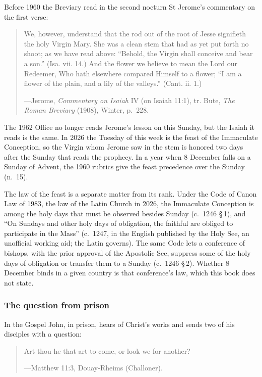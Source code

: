 \noindent Before 1960 the Breviary read in the second nocturn St Jerome's commentary on the first
verse:

\begin{quote}
We, however, understand that the rod out of the root of Jesse signifieth the holy Virgin Mary.
She was a clean stem that had as yet put forth no shoot; as we have read above: ``Behold, the
Virgin shall conceive and bear a son.'' (Isa. vii. 14.) And the flower we believe to mean the
Lord our Redeemer, Who hath elsewhere compared Himself to a flower; ``I am a flower of the plain,
and a lily of the valleys.'' (Cant. ii. 1.)\par
{\smallskip\noindent\small ---Jerome, \textit{Commentary on Isaiah} IV (on Isaiah 11:1), tr.
Bute, \textit{The Roman Breviary} (1908), Winter, p.~228.\par}
\end{quote}

The 1962 Office no longer reads Jerome's lesson on this Sunday, but the Isaiah it reads is the
same. In 2026 the Tuesday of this week is the feast of the Immaculate Conception, so the Virgin
whom Jerome saw in the stem is honored two days after the Sunday that reads the prophecy. In a
year when 8 December falls on a Sunday of Advent, the 1960 rubrics give the feast precedence over
the Sunday (n.~15).

The law of the feast is a separate matter from its rank. Under the Code of Canon Law of 1983, the
law of the Latin Church in 2026, the Immaculate Conception is among the holy days that must be
observed besides Sunday (c.~1246 \S\,1), and ``On Sundays and other holy days of obligation, the
faithful are obliged to participate in the Mass'' (c.~1247, in the English published by
the Holy See, an unofficial working aid; the Latin governs). The same Code lets a conference of bishops, with the
prior approval of the Apostolic See, suppress some of the holy days of obligation or transfer them
to a Sunday (c.~1246 \S\,2). Whether 8 December binds in a given country is that conference's
law, which this book does not state.

\subsubsection{The question from prison}

In the Gospel John, in prison, hears of Christ's works and sends two of his disciples with a
question:

\begin{quote}
Art thou he that art to come, or look we for another?\par
{\smallskip\noindent\small ---Matthew 11:3, Douay-Rheims (Challoner).\par}
\end{quote}

